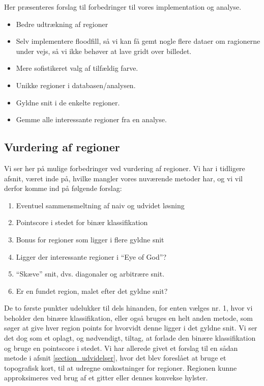 {
{\sffamily Her præsenteres forslag til forbedringer til vores
implementation og analyse.
}

\begin{itemize}
    \item Bedre udtrækning af regioner
    \item Selv implementere floodfill, så vi kan få gemt nogle flere
    dataer om ragionerne under vejs, så vi ikke behøver at lave gridt
    over billedet.
    \item Mere sofistikeret valg af tilfældig farve.
    \item Unikke regioner i databasen/analysen.
    \item Gyldne snit i de enkelte regioner.
    \item Gemme alle interessante regioner fra en analyse.
\end{itemize}

\subsection{Vurdering af regioner}
Vi ser her på mulige forbedringer ved vurdering af regioner.  Vi har i
tidligere afsnit, været inde på, hvilke mangler vores nuværende metoder
har, og vi vil derfor komme ind på følgende forslag:
\begin{enumerate}
    \item Eventuel sammensmeltning af naiv og udvidet løsning
    \item Pointscore i stedet for binær klassifikation
    \item Bonus for regioner som ligger i flere gyldne snit
    \item Ligger der interessante regioner i ``Eye of God''?
    \item ``Skæve'' snit, dvs. diagonaler og arbitrære snit.
    \item Er en fundet region, malet efter det gyldne snit?
\end{enumerate}

De to første punkter udelukker til dels hinanden, for enten vælges nr.
1, hvor vi beholder den binære klassifikation, eller også bruges en helt
anden metode, som søger at give hver region points for hvorvidt denne
ligger i det gyldne snit. Vi ser det dog som et oplagt, og nødvendigt,
tiltag, at forlade den binære klassifikation og bruge en pointscore i
stedet. Vi har allerede givet et forslag til en sådan metode i afsnit
\ref{section_udvidelser}, hvor det blev foreslået at bruge et
topografisk kort, til at udregne omkostninger for regioner. Regionen
kunne approksimeres ved brug af et gitter eller dennes konvekse hylster.

}
